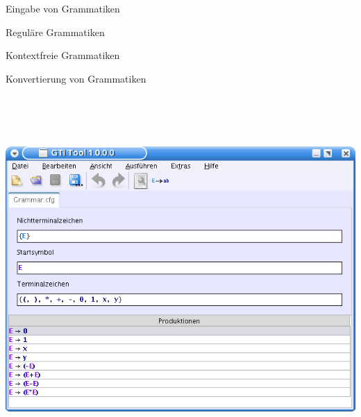 



{
    \begin{itemgroup}{}
	\item Eingabe von Grammatiken
		\begin{itemgroup}{}
		\item Reguläre Grammatiken
		\item Kontextfreie Grammatiken
		\end{itemgroup}
	\item Konvertierung von Grammatiken
	\end{itemgroup}
    
	\vfill{}
}

{
  \begin{center}
    \includegraphics[height=14cm]{../images/cfg_example.png}
  \end{center} 
}

